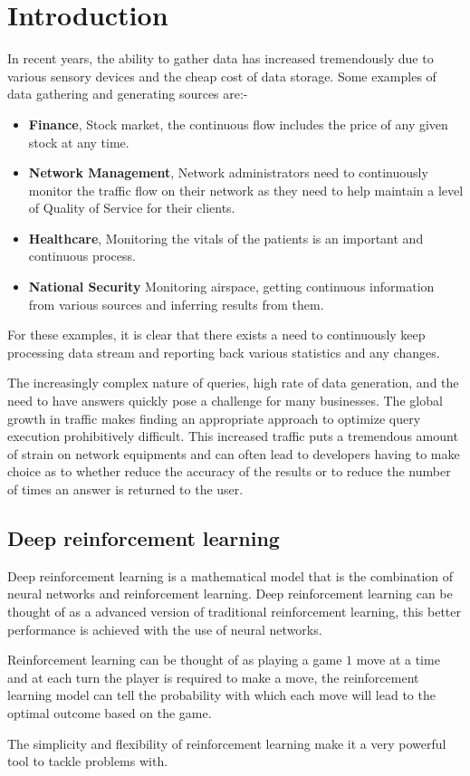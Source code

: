 \chapter{Introduction}
\label{chapter:Introduction}
\thispagestyle{myheadings}
In recent years, the ability to gather data has increased tremendously due to various sensory devices and the cheap cost of data storage. Some examples of data gathering and generating sources are:-
\begin{itemize}
    \item \textbf{Finance}, Stock market, the continuous flow includes the price of any given stock at any time. 
    \item \textbf{Network Management}, Network administrators need to continuously monitor the traffic flow on their network as they need to help maintain a level of Quality of Service for their clients.
    \item \textbf{Healthcare}, Monitoring the vitals of the patients is an important and continuous process. 
    \item \textbf{National Security} Monitoring airspace, getting continuous information from various sources and inferring results from them.
\end{itemize} 
For these examples, it is clear that there exists a need to continuously keep processing data stream and reporting back various statistics and any changes.
\par The increasingly complex nature of queries, high rate of data generation, and the need to have answers quickly pose a challenge for many businesses. The global growth in traffic makes finding an appropriate approach to optimize query execution prohibitively difficult. This increased traffic puts a tremendous amount of strain on network equipments and can often lead to developers having to make choice as to whether reduce the accuracy of the results or to reduce the number of times an answer is returned to the user.  

\section{Deep reinforcement learning}
Deep reinforcement learning is a mathematical model that is the combination of neural networks and reinforcement learning. Deep reinforcement learning can be thought of as a advanced version of traditional reinforcement learning, this better performance is achieved with the use of neural networks.
\par Reinforcement learning can be thought of as playing a game $1$ move at a time and at each turn the player is required to make a move, the reinforcement learning model can tell the probability with which each move will lead to the optimal outcome based on the game.
\par The simplicity and flexibility of reinforcement learning make it a very powerful tool to tackle problems with. 
